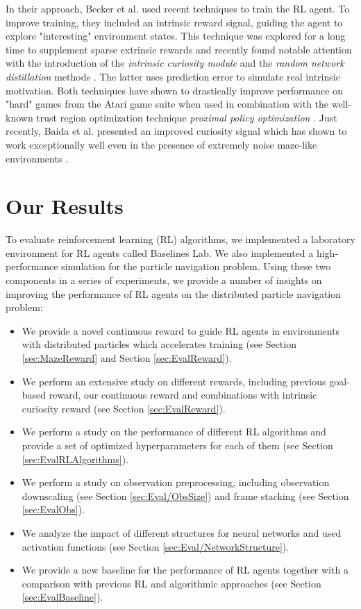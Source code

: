 In their approach, Becker et al. used recent techniques to train the RL agent. To improve training, they included an intrinsic reward signal, guiding the agent to explore "interesting" environment states. This technique was explored for a long time to supplement sparse extrinsic rewards \cite{pathak2017curiosity, mohamed2015variational, houthooft2016variational} and recently found notable attention with the introduction of the \textit{intrinsic curiosity module} \cite{burda2018large} and the \textit{random network distillation} methods \cite{burda2018exploration}. The latter uses prediction error to simulate real intrinsic motivation. Both techniques have shown to drastically improve performance on "hard" games from the Atari game suite when used in combination with the well-known trust region optimization technique \textit{proximal policy optimization} \cite{schulman2017proximal}. Just recently, Baida et al. presented an improved curiosity signal which has shown to work exceptionally well even in the presence of extremely noise maze-like environments \cite{badia2020never}.

\section{Our Results} \label{sec:Results}
To evaluate reinforcement learning (RL) algorithms, we implemented a laboratory environment for RL agents called Baselines Lab. We also implemented a high-performance simulation for the particle navigation problem. Using these two components in a series of experiments, we provide a number of insights on improving the performance of RL agents on the distributed particle navigation problem:

\begin{itemize}
    \item We provide a novel continuous reward to guide RL agents in environments with distributed particles which accelerates training (see Section \ref{sec:MazeReward} and Section \ref{sec:EvalReward}).
    \item We perform an extensive study on different rewards, including previous goal-based reward, our continuous reward and combinations with intrinsic curiosity reward (see Section \ref{sec:EvalReward}).
    \item We perform a study on the performance of different RL algorithms and provide a set of optimized hyperparameters for each of them (see Section \ref{sec:EvalRLAlgorithms}).
    \item We perform a study on observation preprocessing, including observation downscaling (see Section \ref{sec:Eval/ObsSize}) and frame stacking (see Section \ref{sec:EvalObs}).
    \item We analyze the impact of different structures for neural networks and used activation functions (see Section \ref{sec:Eval/NetworkStructure}).
    \item We provide a new baseline for the performance of RL agents together with a comparison with previous RL and algorithmic approaches (see Section \ref{sec:EvalBaseline}).  
\end{itemize}

